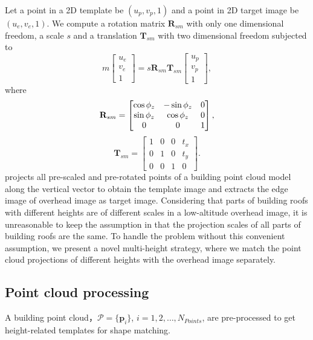 Let a point in a 2D template be $(u_p, v_p, 1)$ and a point in 2D target image be $(u_e, v_e, 1)$. We compute a rotation matrix $\mathbf{R}_{sm}$ with only one dimensional freedom, a scale $s$ and a translation $\mathbf{T}_{sm}$ with two dimensional freedom subjected to
%
\begin{equation}\label{eq:projection_shape_matching}
m\begin{bmatrix}
u_e\\v_e\\1
\end{bmatrix}
=s\mathbf{R}_{sm}\mathbf{T}_{sm}
\begin{bmatrix}
u_p\\v_p\\1
\end{bmatrix},
\end{equation}
%
where 
\begin{equation}\label{eq:rotation_shape_matching}
\mathbf{R}_{sm}= \begin{bmatrix}
\cos\phi_{z} & -\sin\phi_{z} & 0 \cr \sin\phi_{z} & \cos\phi_{z} & 0 \cr 0 & 0 & 1
\end{bmatrix},
\end{equation}
\begin{equation}\label{eq:translation_shape_matching}
\mathbf{T}_{sm}=\begin{bmatrix}
1 & 0 & 0 & t_x \\ 0 & 1 & 0 & t_y \\ 0 & 0 & 1 & 0
\end{bmatrix}.
\end{equation}
%
\cite{ECDM} projects all pre-scaled and pre-rotated points of a building point cloud model along the vertical vector to obtain the template image and extracts the edge image of overhead image as target image. 
%
Considering that parts of building roofs with different heights are of different scales in a low-altitude overhead image, it is unreasonable to keep the assumption in \cite{ECDM} that the projection scales of all parts of building roofs are the same.  
%
To handle the problem without this convenient assumption, we present a novel multi-height strategy, where we match the point cloud projections of different heights with the overhead image separately. 
%
%
\subsection{Point cloud processing}
A building point cloud，$\mathcal{P}=\{\mathbf{p}_i\}$, $i=1,2,\ldots,N_{Points}$, are pre-processed to get height-related templates for shape matching. 
